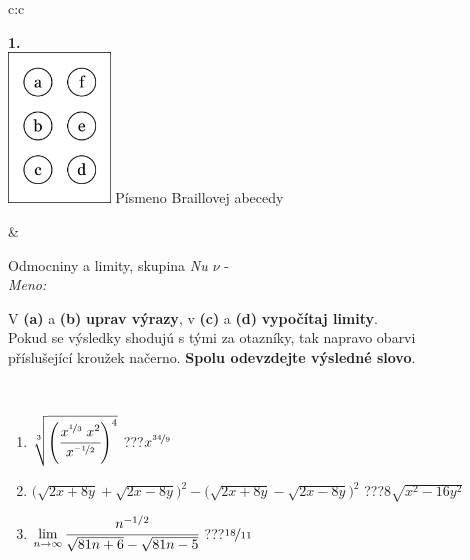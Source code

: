 \documentclass[10pt]{report}
\begin{document}
\begin{tabular}{c:c}
\begin{minipage}[c][104.5mm][t]{0.5\linewidth}
\begin{center}
\begin{minipage}{0.20\linewidth}
\begin{center}
{\Huge\bfseries 1.} \\[2mm]
\includegraphics[height=40mm]{../images/braille.png}
{\small Písmeno Braillovej abecedy}
\end{center}
\end{minipage}
\end{center}
\end{minipage}
&
\begin{minipage}[c][104.5mm][t]{0.5\linewidth}
\begin{center}
\vspace{7mm}
{\huge Odmocniny a limity, skupina \textit{Nu $\nu$} -}\\[5mm]
\textit{Meno:}\phantom{xxxxxxxxxxxxxxxxxxxxxxxxxxxxxxxxxxxxxxxxxxxxxxxxxxxxxxxxxxxxxxxxx}\\[5mm]
\begin{minipage}{0.95\linewidth}
\begin{center}
V \textbf{(a)} a \textbf{(b)} \textbf{uprav výrazy}, v \textbf{(c)} a \textbf{(d)} \textbf{vypočítaj limity}.\\Pokud se výsledky shodujú s tými za otazníky, tak napravo obarvi\\příslušející kroužek načerno. \textbf{Spolu odevzdejte výsledné slovo}.
\end{center}
\end{minipage}
\\[1mm]
\begin{minipage}{0.79\linewidth}
\begin{center}
\begin{varwidth}{\linewidth}
\begin{enumerate}
\small
\item $\sqrt[3]{\left(\cfrac{x^{\nicefrac{1}{3}}\;x^{2}}{x^{\nicefrac{-1}{2}}}\right)^{4}}$\quad \dotfill\; ???\;\dotfill \quad $x^{\nicefrac{34}{9}}$
\item {\footnotesize{\scriptsize$\big(\sqrt{2x+8y}+\sqrt{2x-8y}\big)^2-\big(\sqrt{2x+8y}-\sqrt{2x-8y}\big)^2$}\quad \dotfill\; ???\;\dotfill \quad $8\sqrt{x^2-16y^2}$}
\item $\lim\limits_{n\to\infty}\cfrac{n^{-1/2}}{\sqrt{81n+6}-\sqrt{81n-5}}$\quad \dotfill\; ???\;\dotfill \quad $\nicefrac{18}{11}$

\end{enumerate}
\end{varwidth}
\end{center}
\end{minipage}
\end{center}
\end{minipage}
\end{tabular}
\end{document}
